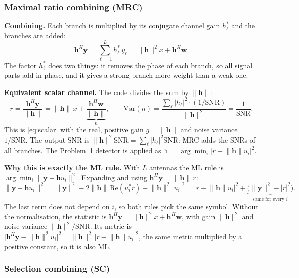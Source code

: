 \documentclass[11pt,a4paper]{article}
\newcommand{\snr}{\mathrm{SNR}}
\newcommand{\norm}[1]{\lVert #1 \rVert}
\newcommand{\abs}[1]{\lvert #1 \rvert}
\newcommand{\h}{\mathbf{h}}
\newcommand{\y}{\mathbf{y}}
\newcommand{\w}{\mathbf{w}}
\begin{document}
\subsubsection{Maximal ratio combining (MRC)}
\label{sec:p2-mrc}

\textbf{Combining.} Each branch is multiplied by its conjugate
channel gain $h_\ell^*$ and the branches are added:
\begin{equation*}
  \h^H\y = \sum_{\ell=1}^{L} h_\ell^*\,y_\ell = \norm{\h}^2 x + \h^H\w .
\end{equation*}
The factor $h_\ell^*$ does two things: it removes the phase of each branch, so all
signal parts add in phase, and it gives a strong branch more weight than a weak one.

\textbf{Equivalent scalar channel.} The code divides the sum by $\norm{\h}$:
\begin{equation}
  r = \frac{\h^H\y}{\norm{\h}} = \norm{\h}\,x + \underbrace{\frac{\h^H\w}{\norm{\h}}}_{n},
  \qquad
  \mathrm{Var}(n) = \frac{\sum_\ell \abs{h_\ell}^2\cdot(1/\snr)}{\norm{\h}^2} = \frac{1}{\snr}.
  \label{eq:p2-mrc}
\end{equation}
This is \eqref{eq:scalar} with the real, positive gain $g = \norm{\h}$ and noise
variance $1/\snr$. The output SNR is
$\norm{\h}^2\snr = \sum_\ell \abs{h_\ell}^2\snr$: MRC adds the SNRs of all branches.
The Problem~1 detector is applied as $\hat\imath = \arg\min_i \abs{r - \norm{\h}u_i}^2$.

\textbf{Why this is exactly the ML rule.} With $L$ antennas the ML rule is
$\arg\min_i \norm{\y - \h u_i}^2$. Expanding and using $\h^H\y = \norm{\h}\,r$:
\begin{equation*}
  \norm{\y - \h u_i}^2
  = \norm{\y}^2 - 2\norm{\h}\,\mathrm{Re}(u_i^* r) + \norm{\h}^2\abs{u_i}^2
  = \abs{r - \norm{\h}u_i}^2 + \underbrace{\big(\norm{\y}^2 - \abs{r}^2\big)}_{\text{same for every } i}.
\end{equation*}
The last term does not depend on $i$, so both rules pick the same symbol. Without
the normalisation, the statistic is $\h^H\y = \norm{\h}^2x + \h^H\w$, with gain
$\norm{\h}^2$ and noise variance $\norm{\h}^2/\snr$. Its metric is
$\abs{\h^H\y - \norm{\h}^2u_i}^2 = \norm{\h}^2\,\abs{r - \norm{\h}u_i}^2$, the same
metric multiplied by a positive constant, so it is also ML.

\subsubsection{Selection combining (SC)}
\label{sec:p2-sc}
\end{document}
